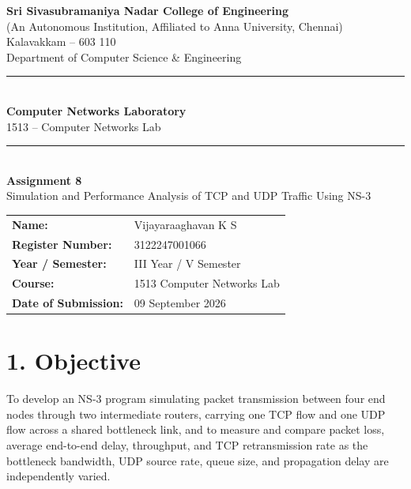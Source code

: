 \documentclass[11pt]{article}
\title{\vspace{-2cm}}
\date{}
\begin{document}
\begin{titlepage}
\centering
\vspace*{1cm}
{\large \textbf{Sri Sivasubramaniya Nadar College of Engineering}}\\
{\small (An Autonomous Institution, Affiliated to Anna University, Chennai)}\\
{\small Kalavakkam -- 603 110}\\[0.3cm]
{\small Department of Computer Science \& Engineering}\\[1.5cm]

\rule{\linewidth}{0.5mm}\\[0.4cm]
{\LARGE \textbf{Computer Networks Laboratory}}\\[0.3cm]
{\Large 1513 -- Computer Networks Lab}\\[0.4cm]
\rule{\linewidth}{0.5mm}\\[1.5cm]

{\huge \textbf{Assignment 8}}\\[0.4cm]
{\Large Simulation and Performance Analysis of TCP and UDP Traffic Using NS-3}\\[2cm]

\begin{center}
\begin{tabular}{ll}
\textbf{Name:} & Vijayaraaghavan K S \\[0.2cm]
\textbf{Register Number:} & 3122247001066 \\[0.2cm]
\textbf{Year / Semester:} & III Year / V Semester \\[0.2cm]
\textbf{Course:} & 1513 Computer Networks Lab \\[0.2cm]
\textbf{Date of Submission:} & 09 September 2026 \\[0.2cm]
\end{tabular}
\end{center}

\vfill
\end{titlepage}

\section*{1. Objective}
To develop an NS-3 program simulating packet transmission between four end
nodes through two intermediate routers, carrying one TCP flow and one UDP
flow across a shared bottleneck link, and to measure and compare packet
loss, average end-to-end delay, throughput, and TCP retransmission rate as
the bottleneck bandwidth, UDP source rate, queue size, and propagation
delay are independently varied.
\end{document}
